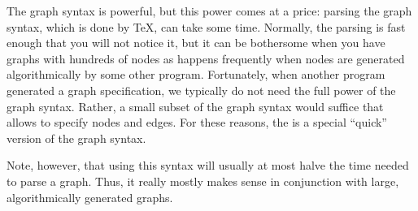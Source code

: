 The graph syntax is powerful, but this power comes at a price: parsing the
graph syntax, which is done by \TeX, can take some time. Normally, the parsing
is fast enough that you will not notice it, but it can be bothersome when you
have graphs with hundreds of nodes as happens frequently when nodes are
generated algorithmically by some other program. Fortunately, when another
program generated a graph specification, we typically do not need the full
power of the graph syntax. Rather, a small subset of the graph syntax would
suffice that allows to specify nodes and edges. For these reasons, the is a
special ``quick'' version of the graph syntax.

Note, however, that using this syntax will usually at most halve the time
needed to parse a graph. Thus, it really mostly makes sense in conjunction with
large, algorithmically generated graphs.

